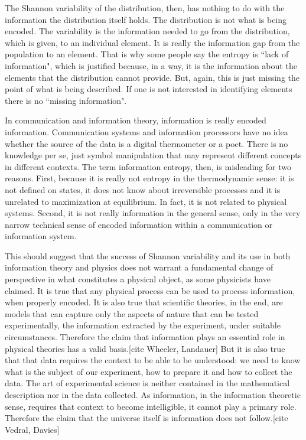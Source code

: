 \documentclass{article}
\begin{document}
The Shannon variability of the distribution, then, has nothing to do with the information the distribution itself holds. The distribution is not what is being encoded. The variability is the information needed to go from the distribution, which is given, to an individual element. It is really the information gap from the population to an element. That is why some people say the entropy is ``lack of information", which is justified because, in a way, it is the information about the elements that the distribution cannot provide. But, again, this is just missing the point of what is being described. If one is not interested in identifying elements there is no ``missing information".

In communication and information theory, information is really encoded information. Communication systems and information processors have no idea whether the source of the data is a digital thermometer or a poet. There is no knowledge per se, just symbol manipulation that may represent different concepts in different contexts. The term information entropy, then, is misleading for two reasons. First, because it is really not entropy in the thermodynamic sense: it is not defined on states, it does not know about irreversible processes and it is unrelated to maximization at equilibrium. In fact, it is not related to physical systems. Second, it is not really information in the general sense, only in the very narrow technical sense of encoded information within a communication or information system.

This should suggest that the success of Shannon variability and its use in both information theory and physics does not warrant a fundamental change of perspective in what constitutes a physical object, as some physicists have claimed. It is true that any physical process can be used to process information, when properly encoded. It is also true that scientific theories, in the end, are models that can capture only the aspects of nature that can be tested experimentally, the information extracted by the experiment, under suitable circumstances. Therefore the claim that information plays an essential role in physical theories has a valid basis.[cite Wheeler, Landauer] But it is also true that that data requires the context to be able to be understood: we need to know what is the subject of our experiment, how to prepare it and how to collect the data. The art of experimental science is neither contained in the mathematical description nor in the data collected. As information, in the information theoretic sense, requires that context to become intelligible, it cannot play a primary role. Therefore the claim that the universe itself is information does not follow.[cite Vedral, Davies]
\end{document}

